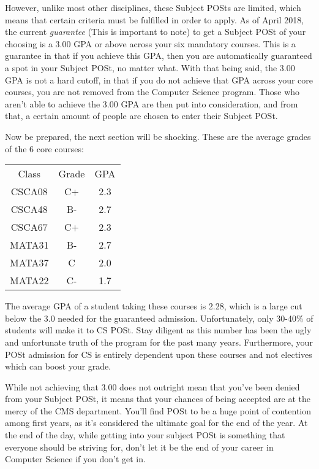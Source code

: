 \documentclass[11pt]{article}
\begin{document}
However, unlike most other disciplines, these Subject POSts are limited,
which means that certain criteria must be fulfilled in order to apply.
As of April 2018, the current \textit{guarantee} (This is important to
note) to get a Subject POSt of your choosing is a 3.00 GPA or above
across your six mandatory courses. This is a guarantee in that if you
achieve this GPA, then you are automatically guaranteed a spot in your
Subject POSt, no matter what. With that being said, the 3.00 GPA is not
a hard cutoff, in that if you do not achieve that GPA across your core
courses, you are not removed from the Computer Science program. Those
who aren't able to achieve the 3.00 GPA are then put into consideration,
and from that, a certain amount of people are chosen to enter their
Subject POSt.

Now be prepared, the next section will be shocking. These are the
average grades of the 6 core courses:

\begin{center}
    \begin{tabular}{|c|c|c|}
    Class&Grade&GPA \\
     CSCA08&C+&2.3\\
     CSCA48&B-&2.7\\
     CSCA67&C+&2.3\\
     MATA31&B-&2.7\\
     MATA37&C&2.0\\
     MATA22&C-&1.7 
    \end{tabular}
\end{center}
The average GPA of a student taking these courses is 2.28, which
is a large cut below the 3.0 needed for the guaranteed admission.
Unfortunately, only 30-40\% of students will make it to CS POSt. Stay
diligent as this number has been the ugly and unfortunate truth of the
program for the past many years. Furthermore, your POSt admission for
CS is entirely dependent upon these courses and not electives which can
boost your grade.

While not achieving that 3.00 does not outright mean that you've been
denied from your Subject POSt, it means that your chances of being
accepted are at the mercy of the CMS department. You'll find POSt to be
a huge point of contention among first years, as it's considered the
ultimate goal for the end of the year. At the end of the day, while
getting into your subject POSt is something that everyone should be
striving for, don't let it be the end of your career in Computer Science
if you don't get in.
\end{document}

